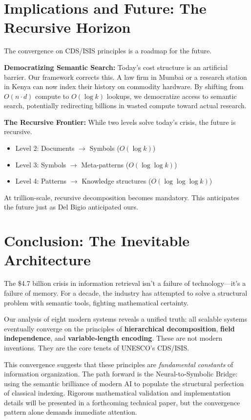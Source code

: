 \documentclass[manuscript,screen,review]{acmart}
\begin{document}
\section{Implications and Future: The Recursive Horizon}

The convergence on CDS/ISIS principles is a roadmap for the future.

\textbf{Democratizing Semantic Search:} Today's cost structure is an artificial barrier. Our framework corrects this. A law firm in Mumbai or a research station in Kenya can now index their history on commodity hardware. By shifting from $O(n \cdot d)$ compute to $O(\log k)$ lookups, we democratize access to semantic search, potentially redirecting billions in wasted compute toward actual research.

\textbf{The Recursive Frontier:} While two levels solve today's crisis, the future is recursive.
\begin{itemize}
\item Level 2: Documents $\rightarrow$ Symbols ($O(\log k)$)
\item Level 3: Symbols $\rightarrow$ Meta-patterns ($O(\log \log k)$)
\item Level 4: Patterns $\rightarrow$ Knowledge structures ($O(\log \log \log k)$)
\end{itemize}

At trillion-scale, recursive decomposition becomes mandatory. This anticipates the future just as Del Bigio anticipated ours.

\section{Conclusion: The Inevitable Architecture}

The \$4.7 billion crisis in information retrieval isn't a failure of technology---it's a failure of memory. For a decade, the industry has attempted to solve a structural problem with semantic tools, fighting mathematical certainty.

Our analysis of eight modern systems reveals a unified truth: all scalable systems eventually converge on the principles of \textbf{hierarchical decomposition}, \textbf{field independence}, and \textbf{variable-length encoding}. These are not modern inventions. They are the core tenets of UNESCO's CDS/ISIS.

This convergence suggests that these principles are \textit{fundamental constants} of information organization. The path forward is the Neural-to-Symbolic Bridge: using the semantic brilliance of modern AI to populate the structural perfection of classical indexing. Rigorous mathematical validation and implementation details will be presented in a forthcoming technical paper, but the convergence pattern alone demands immediate attention.
\end{document}
